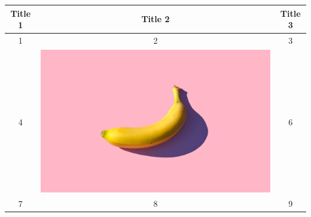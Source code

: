 \documentclass{article}
\begin{document}
\begin{tabular}{|c|c|c|}
\hline
Title 1 & Title 2 & Title 3 \\ \hline
1 & 2 & 3 \\ \hline
4 & \includegraphics{img.png} & 6 \\ \hline
7 & 8 & 9 \\ \hline
\end{tabular}
\end{document}
